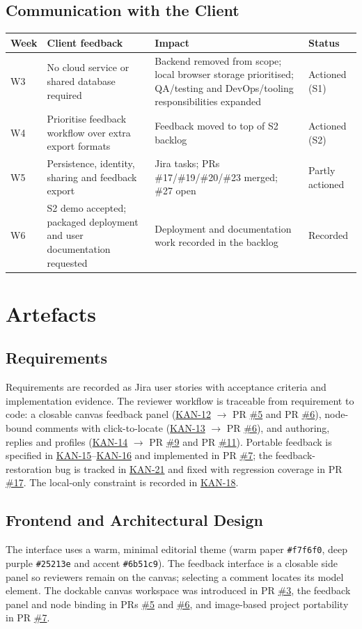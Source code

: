 \documentclass[10pt,a4paper]{article}
\newcommand{\ghbase}{https://github.com/lkevincc0/mm-local-editor}
\newcommand{\PR}[1]{\href{\ghbase/pull/#1}{\##1}}
\newcommand{\jirabase}{https://student-team-zvzgb5e3.atlassian.net}
\newcommand{\JIRA}[1]{\href{\jirabase/browse/KAN-#1}{KAN-#1}}
\begin{document}
\subsection{Communication with the Client}
{\small
\begin{tabularx}{\textwidth}{@{}l X X l@{}}
\toprule
\textbf{Week} & \textbf{Client feedback} & \textbf{Impact} & \textbf{Status}\\
\midrule
W3 & No cloud service or shared database required & Backend removed from scope; local browser storage prioritised; QA/testing and DevOps/tooling responsibilities expanded & Actioned (S1)\\
W4 & Prioritise feedback workflow over extra export formats & Feedback moved to top of S2 backlog & Actioned (S2)\\
W5 & Persistence, identity, sharing and feedback export & Jira tasks; PRs \#17/\#19/\#20/\#23 merged; \#27 open & Partly actioned\\
W6 & S2 demo accepted; packaged deployment and user documentation requested & Deployment and documentation work recorded in the backlog & Recorded\\
\bottomrule
\end{tabularx}
}

\section{Artefacts}

\subsection{Requirements}
Requirements are recorded as Jira user stories with acceptance criteria and implementation evidence. The reviewer workflow is traceable from requirement to code: a closable canvas feedback panel (\JIRA{12} $\rightarrow$ PR \PR{5} and PR \PR{6}), node-bound comments with click-to-locate (\JIRA{13} $\rightarrow$ PR \PR{6}), and authoring, replies and profiles (\JIRA{14} $\rightarrow$ PR \PR{9} and PR \PR{11}). Portable feedback is specified in \JIRA{15}--\JIRA{16} and implemented in PR \PR{7}; the feedback-restoration bug is tracked in \JIRA{21} and fixed with regression coverage in PR \PR{17}. The local-only constraint is recorded in \JIRA{18}.

\subsection{Frontend and Architectural Design}
The interface uses a warm, minimal editorial theme (warm paper \texttt{\#f7f6f0}, deep purple \texttt{\#25213e} and accent \texttt{\#6b51c9}). The feedback interface is a closable side panel so reviewers remain on the canvas; selecting a comment locates its model element. The dockable canvas workspace was introduced in PR \PR{3}, the feedback panel and node binding in PRs \PR{5} and \PR{6}, and image-based project portability in PR \PR{7}.
\end{document}

